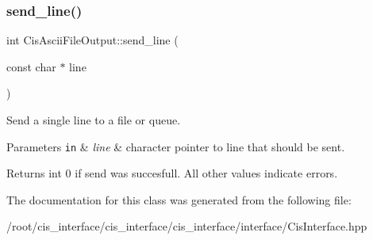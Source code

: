 \subsubsection{\texorpdfstring{send\+\_\+line()}{send\_line()}}
{\footnotesize\ttfamily int Cis\+Ascii\+File\+Output\+::send\+\_\+line (\begin{DoxyParamCaption}\item[{const char $\ast$}]{line }\end{DoxyParamCaption})\hspace{0.3cm}{\ttfamily [inline]}}



Send a single line to a file or queue. 


\begin{DoxyParams}[1]{Parameters}
\mbox{\tt in}  & {\em line} & character pointer to line that should be sent. \\
\hline
\end{DoxyParams}
\begin{DoxyReturn}{Returns}
int 0 if send was succesfull. All other values indicate errors. 
\end{DoxyReturn}


The documentation for this class was generated from the following file\+:\begin{DoxyCompactItemize}
\item 
/root/cis\+\_\+interface/cis\+\_\+interface/cis\+\_\+interface/interface/Cis\+Interface.\+hpp\end{DoxyCompactItemize}
